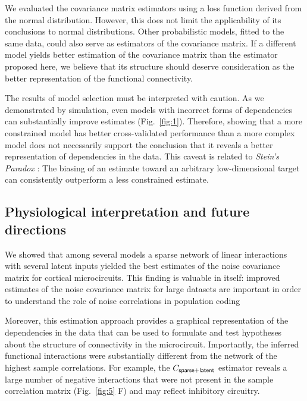 We evaluated the covariance matrix estimators using a loss function derived from the normal distribution.  However, this does not limit the applicability of its conclusions to normal distributions. Other probabilistic models, fitted to the same data, could also serve as estimators of the covariance matrix.  If a different model yields better estimation of the covariance matrix than the estimator proposed here, we believe that its structure should deserve consideration as the better representation of the functional connectivity.

The results of model selection must be interpreted with caution.  As we demonstrated by simulation, even models with incorrect forms of dependencies can substantially improve estimates (Fig.~\ref{fig:1}). Therefore, showing that a more constrained model has better cross-validated performance than a more complex model does not necessarily support the conclusion that it reveals a better representation of dependencies in the data.  This caveat is related to \emph{Stein's Paradox} \cite{Efron:1977}: The biasing of an estimate toward an arbitrary low-dimensional target can consistently outperform a less constrained estimate.

\subsection*{Physiological interpretation and future directions}

We showed that among several models a sparse network of linear interactions with several latent inputs yielded the best estimates of the noise covariance matrix for cortical microcircuits.  This finding is valuable in itself: improved estimates of the noise covariance matrix for large datasets are important in order to understand the role of noise correlations in population coding \cite{Abbott:1999, Sompolinsky:2001, Averbeck:2006, Josic:2009, Ecker:2011}

Moreover, this estimation approach provides a graphical representation of the dependencies in the data that can be used to formulate and test hypotheses about the structure of connectivity in the microcircuit. Importantly, the inferred functional interactions were substantially different from the network of the highest sample correlations.  For example, the $C_{\sf sparse+latent}$ estimator reveals a large number of negative interactions that were not present in the sample correlation matrix (Fig.~\ref{fig:5} F) and may reflect inhibitory circuitry.

